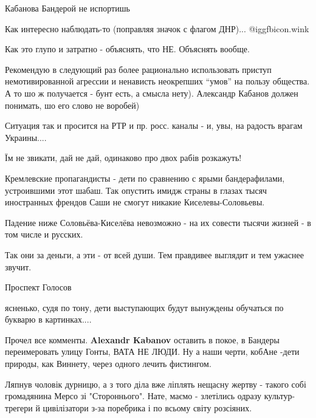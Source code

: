 \begin{itemize}
Кабанова Бандерой не испортишь

Как интересно наблюдать-то (поправляя значок с флагом ДНР)...  @igg{fbicon.wink} 

Как это глупо и затратно - объяснять, что НЕ. Объяснять вообще.


Рекомендую в следующий раз более рационально использовать приступ
немотивированной агрессии и ненависть неокрепших \enquote{умов} на пользу общества. А то
шо ж получается - бунт есть, а смысла нету). Александр Кабанов должен понимать,
шо его слово не воробей)



Ситуация так и просится на РТР и пр. росс. каналы - и, увы, на радость врагам
Украины....

\begin{itemize} %
Їм не звикати, дай не дай, одинаково про двох рабів розкажуть!


Кремлевские пропагандисты - дети по сравнению с ярыми бандерафилами,
устроившими этот шабаш. Так опустить имидж страны в глазах тысяч иностранных
френдов Саши не смогут никакие Киселевы-Соловьевы.


Падение ниже Соловьёва-Киселёва невозможно - на их совести тысячи жизней - в том числе и русских.

Так они за деньги, а эти - от всей души. Тем правдивее выглядит и тем ужаснее звучит.
\end{itemize} %

Проспект Голосов

ясненько, судя по тону, дети выступающих будут вынуждены обучаться по букварю в картинках....


Прочел все комменты. \textbf{Alexandr Kabanov} оставить в покое, в Бандеры переимеровать
улицу Гонты, ВАТА НЕ ЛЮДИ. Ну а наши черти, кобАне -дети природы, как Виннету,
через одного лечить фистингом.



Ляпнув чоловік дурницю, а з того діла вже ліплять нещасну жертву - такого собі
громадянина Мерсо зі "Стороннього". Нате, маємо - злетілись одразу
культур-трегери й цивілізатори з-за поребрика і по всьому світу розсіяних.


\end{itemize}
